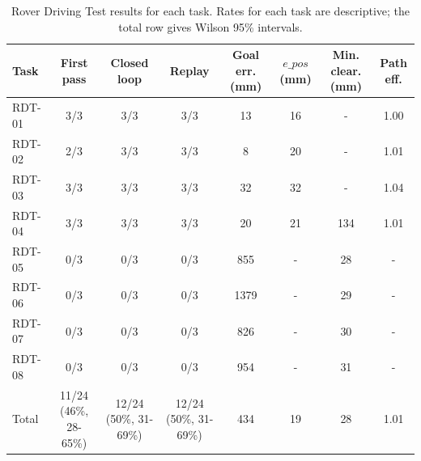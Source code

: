 \begin{table}[htbp]
\centering
\caption{Rover Driving Test results for each task. Rates for each task are descriptive; the total row gives Wilson 95\% intervals.}
\label{tab:rdt_per_task}
\small
\begin{tabular}{lccccccc}
\toprule
Task & First pass & Closed loop & Replay & Goal err. (mm) & $e\_{pos}$ (mm) & Min. clear. (mm) & Path eff. \\
\midrule
RDT-01 & 3/3 & 3/3 & 3/3 & 13 & 16 & - & 1.00 \\
RDT-02 & 2/3 & 3/3 & 3/3 & 8 & 20 & - & 1.01 \\
RDT-03 & 3/3 & 3/3 & 3/3 & 32 & 32 & - & 1.04 \\
RDT-04 & 3/3 & 3/3 & 3/3 & 20 & 21 & 134 & 1.01 \\
RDT-05 & 0/3 & 0/3 & 0/3 & 855 & - & 28 & - \\
RDT-06 & 0/3 & 0/3 & 0/3 & 1379 & - & 29 & - \\
RDT-07 & 0/3 & 0/3 & 0/3 & 826 & - & 30 & - \\
RDT-08 & 0/3 & 0/3 & 0/3 & 954 & - & 31 & - \\
Total & 11/24 (46\%, 28-65\%) & 12/24 (50\%, 31-69\%) & 12/24 (50\%, 31-69\%) & 434 & 19 & 28 & 1.01 \\
\bottomrule
\end{tabular}
\end{table}

